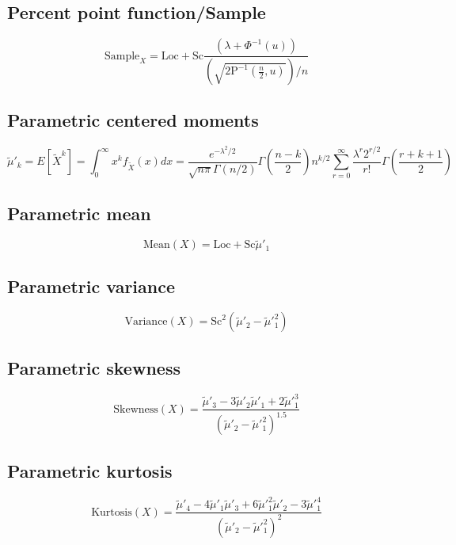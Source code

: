 \documentclass{article}
\begin{document}
\subsection{Percent point function/Sample}
\begin{equation*} \text{Sample}_{X}=\text{Loc}+\text{Sc}\frac{\left(\lambda+\Phi^{-1}\left(u\right)\right)}{\left(\sqrt{2\text{P}^{-1}\left(\frac{n}{2},u\right)}\right)/n} \end{equation*}
\subsection{Parametric centered moments}
\begin{equation*} \tilde{\mu}'_{k}=E[\tilde{X}^k]=\int_{0}^{\infty}x^{k}f_{\tilde{X}}\left(x\right)dx=\frac{e^{-\lambda^{2}/2}}{\sqrt{n\pi}\Gamma\left(n/2\right)}\Gamma\left(\frac{n-k}{2}\right)n^{k/2}\sum_{r=0}^{\infty }\frac{\lambda^{r}2^{r/2}}{r!}\Gamma\left(\frac{r+k+1}{2}\right) \end{equation*}
\subsection{Parametric mean}
\begin{equation*} \mathrm{Mean}(X)=\text{Loc}+\text{Sc}\tilde{\mu}'_{1} \end{equation*}
\subsection{Parametric variance}
\begin{equation*} \mathrm{Variance}(X)=\text{Sc}^{2}(\tilde{\mu}'_{2}-\tilde{\mu}'^{2}_{1}) \end{equation*}
\subsection{Parametric skewness}
\begin{equation*} \mathrm{Skewness}(X)=\frac{\tilde{\mu}'_{3}-3\tilde{\mu}'_{2}\tilde{\mu}'_{1}+2\tilde{\mu}'^{3}_{1}}{(\tilde{\mu}'_{2}-\tilde{\mu}'^{2}_{1})^{1.5}} \end{equation*}
\subsection{Parametric kurtosis}
\begin{equation*} \mathrm{Kurtosis}(X)=\frac{\tilde{\mu}'_{4}-4\tilde{\mu}'_{1}\tilde{\mu}'_{3}+6\tilde{\mu}'^{2}_{1}\tilde{\mu}'_{2}-3\tilde{\mu}'^{4}_{1}}{(\tilde{\mu}'_{2}-\tilde{\mu}'^{2}_{1})^{2}} \end{equation*}
\end{document}
